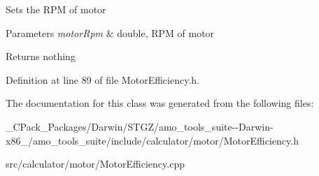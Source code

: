 Sets the R\+PM of motor


\begin{DoxyParams}{Parameters}
{\em motor\+Rpm} & double, R\+PM of motor\\
\hline
\end{DoxyParams}
\begin{DoxyReturn}{Returns}
nothing 
\end{DoxyReturn}


Definition at line 89 of file Motor\+Efficiency.\+h.



The documentation for this class was generated from the following files\+:\begin{DoxyCompactItemize}
\item 
\+\_\+\+C\+Pack\+\_\+\+Packages/\+Darwin/\+S\+T\+G\+Z/amo\+\_\+tools\+\_\+suite-\/-\/\+Darwin-\/x86\+\_/amo\+\_\+tools\+\_\+suite/include/calculator/motor/Motor\+Efficiency.\+h\item 
src/calculator/motor/Motor\+Efficiency.\+cpp\end{DoxyCompactItemize}

